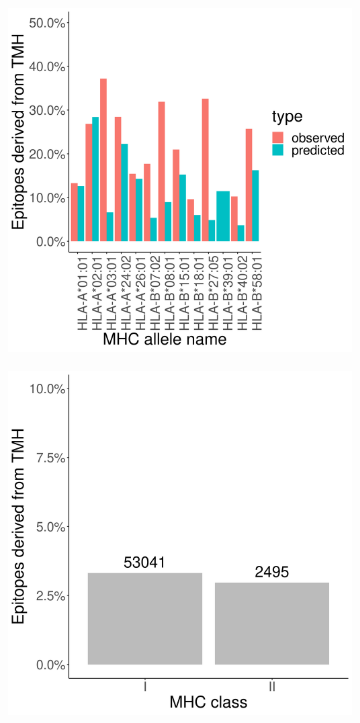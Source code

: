 %
%
\begin{figure}[!htbp]
  \centering
  \begin{subfigure}[t]{0.45\textwidth}
    \centering
    \caption{}
    \includegraphics[width=1.0\textwidth]{bbbq_article_issue_157/figure_2a.png}
    \label{fig:2a}
  \end{subfigure}  
  \hfill
  \begin{subfigure}[t]{0.45\textwidth}
    \centering
    \caption{}
    \includegraphics[width=1.0\textwidth]{bbbq_article_issue_157/figure_2c.png}
    \label{fig:2c}
  \end{subfigure}  


\end{figure}
